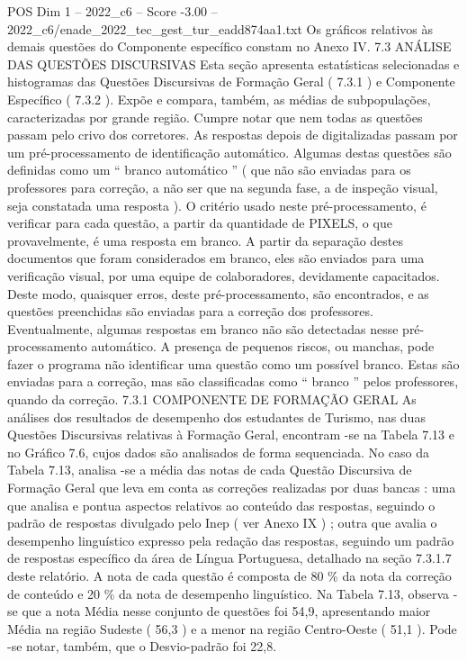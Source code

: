 \begin{textsample}{POS Dim 1 – 2022\_c6 – Score -3.00 – 2022\_c6/enade\_2022\_tec\_gest\_tur\_eadd874aa1.txt}
Os gráficos relativos às demais questões do Componente específico constam no Anexo IV. 7.3 ANÁLISE DAS QUESTÕES DISCURSIVAS Esta seção apresenta estatísticas selecionadas e histogramas das Questões Discursivas de Formação Geral ( 7.3.1 ) e Componente Específico ( 7.3.2 ).
Expõe e compara, também, as médias de subpopulações, caracterizadas por grande região.
Cumpre notar que nem todas as questões passam pelo crivo dos corretores.
As respostas depois de digitalizadas passam por um pré-processamento de identificação automático.
Algumas destas questões são definidas como um “ branco automático ” ( que não são enviadas para os professores para correção, a não ser que na segunda fase, a de inspeção visual, seja constatada uma resposta ).
O critério usado neste pré-processamento, é verificar para cada questão, a partir da quantidade de PIXELS, o que provavelmente, é uma resposta em branco.
A partir da separação destes documentos que foram considerados em branco, eles são enviados para uma verificação visual, por uma equipe de colaboradores, devidamente capacitados.
Deste modo, quaisquer erros, deste pré-processamento, são encontrados, e as questões preenchidas são enviadas para a correção dos professores.
Eventualmente, algumas respostas em branco não são detectadas nesse pré-processamento automático.
A presença de pequenos riscos, ou manchas, pode fazer o programa não identificar uma questão como um possível branco.
Estas são enviadas para a correção, mas são classificadas como “ branco ” pelos professores, quando da correção. 7.3.1 COMPONENTE DE FORMAÇÃO GERAL As análises dos resultados de desempenho dos estudantes de Turismo, nas duas Questões Discursivas relativas à Formação Geral, encontram -se na Tabela 7.13 e no Gráfico 7.6, cujos dados são analisados de forma sequenciada.
No caso da Tabela 7.13, analisa -se a média das notas de cada Questão Discursiva de Formação Geral que leva em conta as correções realizadas por duas bancas : uma que analisa e pontua aspectos relativos ao conteúdo das respostas, seguindo o padrão de respostas divulgado pelo Inep ( ver Anexo IX ) ; outra que avalia o desempenho linguístico expresso pela redação das respostas, seguindo um padrão de respostas específico da área de Língua Portuguesa, detalhado na seção 7.3.1.7 deste relatório.
A nota de cada questão é composta de 80 \% da nota da correção de conteúdo e 20 \% da nota de desempenho linguístico.
Na Tabela 7.13, observa -se que a nota Média nesse conjunto de questões foi 54,9, apresentando maior Média na região Sudeste ( 56,3 ) e a menor na região Centro-Oeste ( 51,1 ).
Pode -se notar, também, que o Desvio-padrão foi 22,8.

\end{textsample}
